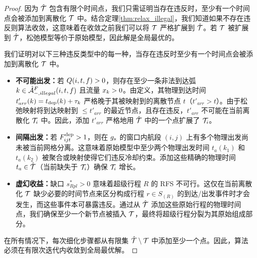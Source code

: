 \begin{proof}
  因为 $\discretizationFull$ 包含有限个时间点，我们只需证明当存在违反时，至少有一个时间点会被添加到离散化 $\discretization$ 中。结合定理\ref{thm:relax_illegal}，我们知道如果不存在违反则算法收敛，这意味着在收敛之前我们可以将 $\discretization$ 严格扩展到 $\discretizationFull$。若 $\discretization$ 被扩展到 $\discretizationFull$，松弛模型等价于原始模型，因此解是全局最优的。

  我们证明对以下三种违反类型中的每一种，当存在违反时至少有一个时间点会被添加到离散化 $\discretization$ 中。
  
  \begin{itemize}
      \item \textbf{不可能出发：}若 $\impDeparts(i,t,f) > 0$，则存在至少一条非法到达弧 $k \in \flightArc[-,illegal](i, t, f)$ 且流量 $\fleetAssignVar_{k} > 0$。由定义，其物理到达时间 $t'_{arr}(k) = t_{\text{dep}}(k) + \travelTime_k$ 严格晚于其被映射到的离散节点 $t$（$t'_{arr} > t$）。由于松弛映射将到达映射到 $\le t'_{arr}$ 的最近节点，且存在违反，$t'_{arr}$ 不可能在当前离散化 $\discretization_i$ 中。因此，添加 $t'_{arr}$ 严格地用 $\discretizationFull$ 中的一个点扩展了 $\discretization_i$。
      
      \item \textbf{间隔出发：}若 $\arcDepartFlow_{ijt} > 1$，则在 $\minInterdepTime_s$ 的窗口内航段 $(i,j)$ 上有多个物理出发尚未被当前网格分离。这意味着原始模型中至少两个物理出发时间 $t_a(k_1)$ 和 $t_a(k_2)$ 被聚合或映射使得它们违反冷却约束。添加这些精确的物理时间 $t_a \in \discretizationFull$（当前缺失于 $\discretization_i$）确保 $\discretization_i$ 增长。
      
      \item \textbf{虚幻收益：}缺口 $s_{Rpl}^* > 0$ 意味着超级行程 $R$ 的 RFS 不可行。这仅在当前离散化 $\discretization$ 缺少必要的时间节点来区分构成行程 $r \in S_{(R)}$ 的到达/出发事件时才会发生，而这些事件本可暴露违反。通过从 $\discretizationFull$ 添加这些原始行程的物理时间点，我们确保至少一个新节点被插入 $\discretization$，最终将超级行程分裂为其原始组成部分。
  \end{itemize}

  在所有情况下，每次细化步骤都从有限集 $\discretizationFull \setminus \discretization$ 中添加至少一个点。因此，算法必须在有限次迭代内收敛到全局最优解。
\end{proof}